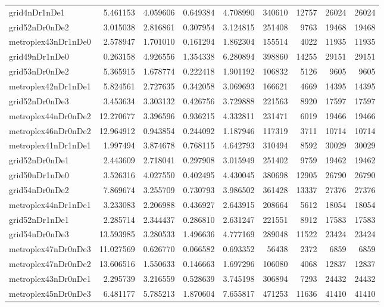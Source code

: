 \begin{longtable}{|l|r|r|r|r|r|r|r|r|}
grid4nDr1nDe1 & 5.461153 & 4.059606 & 0.649384 & 4.708990 & 340610 & 12757 & 26024 & 26024 \\
grid52nDr0nDe2 & 3.015038 & 2.816861 & 0.307954 & 3.124815 & 251408 & 9763 & 19468 & 19468 \\
metroplex43nDr1nDe0 & 2.578947 & 1.701010 & 0.161294 & 1.862304 & 155514 & 4022 & 11935 & 11935 \\
grid49nDr1nDe0 & 0.263158 & 4.926556 & 1.354338 & 6.280894 & 398860 & 14255 & 29151 & 29151 \\
grid53nDr0nDe2 & 5.365915 & 1.678774 & 0.222418 & 1.901192 & 106832 & 5126 & 9605 & 9605 \\
metroplex42nDr1nDe1 & 5.824561 & 2.727635 & 0.342058 & 3.069693 & 166621 & 4669 & 14395 & 14395 \\
grid52nDr0nDe3 & 3.453634 & 3.303132 & 0.426756 & 3.729888 & 221563 & 8920 & 17597 & 17597 \\
metroplex44nDr0nDe2 & 12.270677 & 3.396596 & 0.936215 & 4.332811 & 231471 & 6019 & 19466 & 19466 \\
metroplex46nDr0nDe2 & 12.964912 & 0.943854 & 0.244092 & 1.187946 & 117319 & 3711 & 10714 & 10714 \\
metroplex41nDr1nDe1 & 1.997494 & 3.874678 & 0.768115 & 4.642793 & 310494 & 8592 & 30029 & 30029 \\
grid52nDr0nDe1 & 2.443609 & 2.718041 & 0.297908 & 3.015949 & 251402 & 9759 & 19462 & 19462 \\
grid50nDr1nDe0 & 3.526316 & 4.027550 & 0.402495 & 4.430045 & 380698 & 12905 & 26790 & 26790 \\
grid54nDr0nDe2 & 7.869674 & 3.255709 & 0.730793 & 3.986502 & 361428 & 13337 & 27376 & 27376 \\
metroplex44nDr1nDe1 & 3.233083 & 2.206988 & 0.436927 & 2.643915 & 208664 & 5612 & 18054 & 18054 \\
grid52nDr1nDe1 & 2.285714 & 2.344437 & 0.286810 & 2.631247 & 221551 & 8912 & 17583 & 17583 \\
grid54nDr0nDe3 & 13.593985 & 3.280533 & 1.496636 & 4.777169 & 289048 & 11522 & 23424 & 23424 \\
metroplex47nDr0nDe3 & 11.027569 & 0.626770 & 0.066582 & 0.693352 & 56438 & 2372 & 6859 & 6859 \\
metroplex47nDr0nDe2 & 13.606516 & 1.550633 & 0.146663 & 1.697296 & 106080 & 4068 & 12837 & 12837 \\
metroplex43nDr0nDe1 & 2.295739 & 3.216559 & 0.528639 & 3.745198 & 306894 & 7293 & 24432 & 24432 \\
metroplex45nDr0nDe3 & 6.481177 & 5.785213 & 1.870604 & 7.655817 & 471253 & 11636 & 41410 & 41410 \\

\end{longtable}
